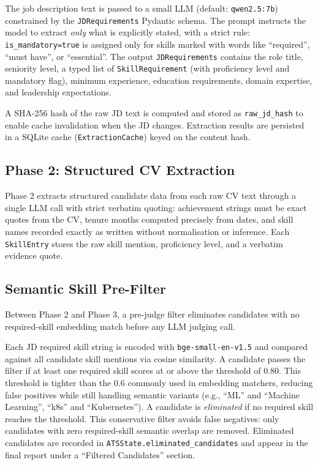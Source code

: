 \documentclass[journal]{IEEEtran}
\begin{document}
The job description text is passed to a small LLM (default:
\texttt{qwen2.5:7b}) constrained by the \texttt{JDRequirements} Pydantic schema.
The prompt instructs the model to extract \emph{only} what is explicitly stated,
with a strict rule: \texttt{is\_mandatory=true} is assigned only for skills marked
with words like ``required'', ``must have'', or ``essential''. The output
\texttt{JDRequirements} contains the role title, seniority level, a typed list of
\texttt{SkillRequirement} (with proficiency level and mandatory flag), minimum
experience, education requirements, domain expertise, and leadership expectations.

A SHA-256 hash of the raw JD text is computed and stored as \texttt{raw\_jd\_hash}
to enable cache invalidation when the JD changes. Extraction results are persisted
in a SQLite cache (\texttt{ExtractionCache}) keyed on the content hash.

\subsection{Phase 2: Structured CV Extraction}
\label{subsec:phase2}

Phase 2 extracts structured candidate data from each raw CV text through a single
LLM call with strict verbatim quoting: achievement strings must be exact quotes
from the CV, tenure months computed precisely from dates, and skill names recorded
exactly as written without normalisation or inference. Each \texttt{SkillEntry}
stores the raw skill mention, proficiency level, and a verbatim evidence quote.

\subsection{Semantic Skill Pre-Filter}
\label{subsec:prefilter}

Between Phase 2 and Phase 3, a pre-judge filter eliminates candidates with no
required-skill embedding match before any LLM judging call.

Each JD required skill string is encoded with \texttt{bge-small-en-v1.5} and
compared against all candidate skill mentions via cosine similarity. A candidate
passes the filter if at least one required skill scores at or above the threshold
of 0.80. This threshold is tighter than the 0.6 commonly used in embedding matchers,
reducing false positives while still handling semantic variants
(e.g., ``ML'' and ``Machine Learning'', ``k8s'' and ``Kubernetes'').
A candidate is \emph{eliminated} if no required skill reaches the threshold.
This conservative filter avoids false negatives: only candidates with zero
required-skill semantic overlap are removed. Eliminated candidates are recorded
in \texttt{ATSState.eliminated\_candidates} and appear in the final report under
a ``Filtered Candidates'' section.
\end{document}
